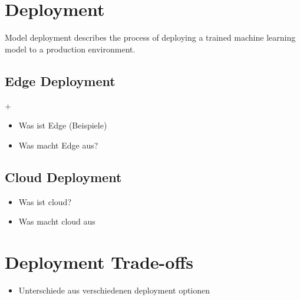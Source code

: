 \section{Deployment}
Model deployment describes the process of deploying a trained machine learning model to a production environment.
\subsection{Edge Deployment}+
\begin{itemize}
    \item Was ist Edge (Beispiele)
    \item Was macht Edge aus?
\end{itemize}
\subsection{Cloud Deployment}
\begin{itemize}
    \item Was ist cloud?
    \item Was macht cloud aus
\end{itemize}
\section{Deployment Trade-offs}
\begin{itemize}
    \item Unterschiede aus verschiedenen deployment optionen
\end{itemize}

\endinput 